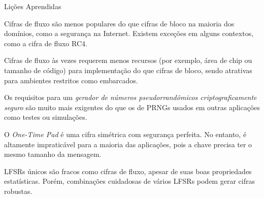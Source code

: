\documentclass{beamer}
\begin{document}
\begin{frame}{Lições Aprendidas}

\begin{itemize}
    \small{
    \item Cifras de fluxo são menos populares do que cifras de bloco na maioria dos domínios, como a segurança na Internet. Existem exceções em alguns contextos, como a cifra de fluxo RC4.

    \item Cifras de fluxo às vezes requerem menos recursos (por exemplo, área de chip ou tamanho de código) para implementação do que cifras de bloco, sendo atrativas para ambientes restritos como embarcados.

    \item Os requisitos para um \textit{gerador de números pseudorrandômicos criptograficamente seguro} são muito mais exigentes do que os de PRNGs usados em outras aplicações como testes ou simulações.

    \item O \textit{One-Time Pad} é uma cifra simétrica com segurança perfeita. No entanto, é altamente impraticável para a maioria das aplicações, pois a chave precisa ter o mesmo tamanho da mensagem.

    \item LFSRs únicos são fracos como cifras de fluxo, apesar de suas boas propriedades estatísticas. Porém, combinações cuidadosas de vários LFSRs podem gerar cifras robustas.}
\end{itemize}

\end{frame}
\end{document}
